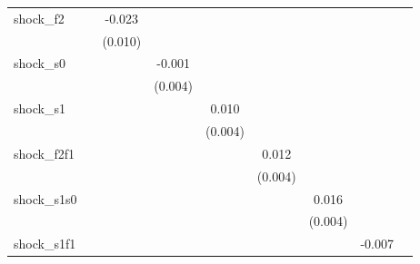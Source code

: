 {\begin{tabular}{l*{8}{c}}
\addlinespace
shock\_f2    &                     &      -0.023\sym{**} &                     &                     &                     &                     &                     &                     \\
            &                     &     (0.010)         &                     &                     &                     &                     &                     &                     \\
\addlinespace
shock\_s0    &                     &                     &      -0.001         &                     &                     &                     &                     &                     \\
            &                     &                     &     (0.004)         &                     &                     &                     &                     &                     \\
\addlinespace
shock\_s1    &                     &                     &                     &       0.010\sym{**} &                     &                     &                     &                     \\
            &                     &                     &                     &     (0.004)         &                     &                     &                     &                     \\
\addlinespace
shock\_f2f1  &                     &                     &                     &                     &       0.012\sym{***}&                     &                     &                     \\
            &                     &                     &                     &                     &     (0.004)         &                     &                     &                     \\
\addlinespace
shock\_s1s0  &                     &                     &                     &                     &                     &       0.016\sym{***}&                     &                     \\
            &                     &                     &                     &                     &                     &     (0.004)         &                     &                     \\
\addlinespace
shock\_s1f1  &                     &                     &                     &                     &                     &                     &      -0.007         &                     \\

\end{tabular}}
